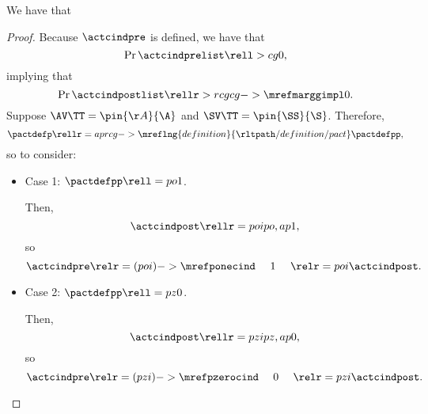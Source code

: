 \begin{proposition}
  We have that %
\end{proposition}

\begin{proof}
  Because $\actcindpre$ is defined,
  we have that 
  $$\Pr{\actcindprelist} \rell > cg 0,$$ 
  implying that
  $$\Pr{\actcindpostlist} \rellr > rcg {cg->\mrefmarggimpl} 0.$$
  Suppose 
  $\AV\TT = \pin{\AA}{\A}$
  and
  $\SV\TT = \pin{\SS}{\S}$. Therefore,
  $$\pactdefp \rellr = ap {rcg->\mreflng{definition}{\rltpath/definition/pact}} \pactdefpp,$$
  so  to consider:
  \begin{itemize}
    \item {} Case 1: $\pactdefpp \rell = po 1$.

      Then,
      $$\actcindpost \rellr = poi po,ap 1,$$
      so
      $$\actcindpre \relr = (poi)->{\mrefponecind} \ \ \ \ 1\ \ \ \ \relr = poi \actcindpost.$$
    \item {} Case 2: $\pactdefpp \rell = pz 0$.

      Then,
      $$\actcindpost \rellr = pzi pz,ap 0,$$
      so
      $$\actcindpre \relr = (pzi)->{\mrefpzerocind} \ \ \ \ 0\ \ \ \ \relr = pzi \actcindpost.$$
  \end{itemize}
\end{proof}
